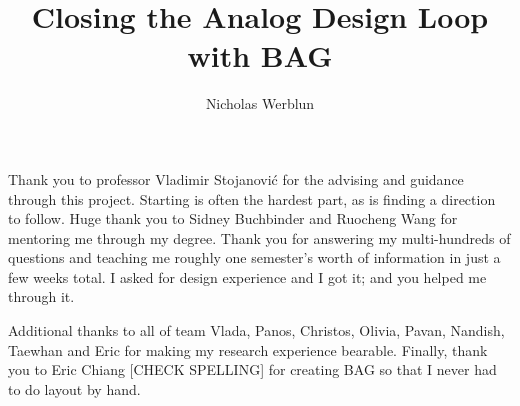 \documentclass[masters]{ucbthesis}
\begin{document}

\title{Closing the Analog Design Loop with BAG}
\author{Nicholas Werblun}


\maketitle
\copyrightpage



\begin{frontmatter}



\tableofcontents
\clearpage
\listoffigures
\clearpage
\listoftables

\begin{acknowledgements}
Thank you to professor Vladimir Stojanovi\'c for the advising and guidance through this project. Starting is often the hardest part, as is finding a direction to follow. Huge thank you to Sidney Buchbinder and Ruocheng Wang for mentoring me through my degree. Thank you for answering my multi-hundreds of questions and teaching me roughly one semester's worth of information in just a few weeks total.  I asked for design experience and I got it; and you helped me through it.

Additional thanks to all of team Vlada, Panos, Christos, Olivia, Pavan, Nandish, Taewhan and Eric for making my research experience bearable. Finally, thank you to Eric Chiang [CHECK SPELLING] for creating BAG so that I never had to do layout by hand.

\end{acknowledgements}

\end{frontmatter}
\pagestyle{headings}
\end{document}

